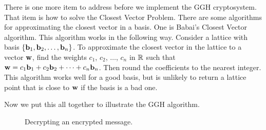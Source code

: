 There is one more item to address before we implement the GGH cryptosystem. That item is how to solve the Closest Vector Problem. There are some algorithms for approximating the closest vector in a basis. One is Babai's Closest Vector algorithm. This algorithm works in the following way. Consider a lattice with basis $\{\mathbf{b}_1, \mathbf{b}_2, \ldots, \mathbf{b}_n\}$. To approximate the closest vector in the lattice to a vector $\mathbf{w}$, find the weights $c_1$, $c_2$, $\ldots$, $c_n$ in $\mathbb{R}$ such that $\mathbf{w} = c_1\mathbf{b}_1 + c_2 \mathbf{b}_2 + \cdots + c_n \mathbf{b}_n$. Then round the coefficients to the nearest integer.  This algorithm works well for a good basis, but is unlikely to return a lattice point that is close to $\mathbf{w}$ if the basis is a bad one. 

Now we put this all together to illustrate the GGH algorithm. 

\begin{figure}[h]
\begin{center}
\caption{Decrypting an encrypted message.}
\label{F:lattices_GGH_ex}
\end{center}
\end{figure}

